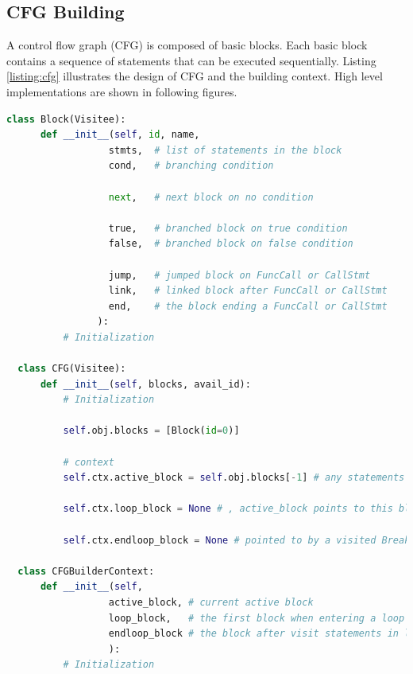 \subsection{CFG Building}
A control flow graph (CFG) is composed of basic blocks. Each basic block contains a sequence of statements that can be executed sequentially. Listing \ref{listing:cfg} illustrates the design of CFG and the building context. High level implementations are shown in following figures.

\begin{lstlisting}[language = python, caption={CFG Design and its building context}, label={listing:cfg}]
  class Block(Visitee):
      def __init__(self, id, name,
                  stmts,  # list of statements in the block
                  cond,   # branching condition

                  next,   # next block on no condition

                  true,   # branched block on true condition
                  false,  # branched block on false condition

                  jump,   # jumped block on FuncCall or CallStmt
                  link,   # linked block after FuncCall or CallStmt
                  end,    # the block ending a FuncCall or CallStmt
                ):
          # Initialization
  
  class CFG(Visitee):
      def __init__(self, blocks, avail_id):
          # Initialization
          
          self.obj.blocks = [Block(id=0)]
  
          # context
          self.ctx.active_block = self.obj.blocks[-1] # any statements rather than IfStmt, WhileStmt and CallStmt will be added to this block when visited
  
          self.ctx.loop_block = None # , active_block points to this block if ContinueStmt is visited
  
          self.ctx.endloop_block = None # pointed to by a visited BreakStmt.

  class CFGBuilderContext:
      def __init__(self, 
                  active_block, # current active block
                  loop_block,   # the first block when entering a loop
                  endloop_block # the block after visit statements in loop
                  ):
          # Initialization
\end{lstlisting}

